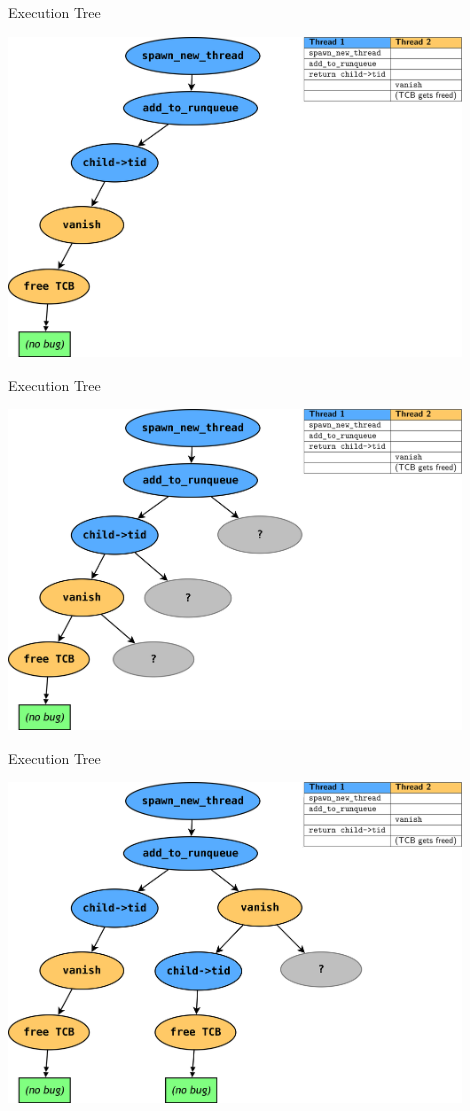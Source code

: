 \documentclass[xcolor=dvipsnames]{beamer}
\begin{document}
\begin{frame}{Execution Tree}
	\begin{center}
		\includegraphics[width=0.9\textwidth]{threadfork0.png}
	\end{center}
\end{frame}
\begin{frame}{Execution Tree}
	\begin{center}
		\includegraphics[width=0.9\textwidth]{threadfork05.png}
	\end{center}
\end{frame}
\begin{frame}{Execution Tree}
	\begin{center}
		\includegraphics[width=0.9\textwidth]{threadfork1.png}
	\end{center}
\end{frame}
\end{document}
